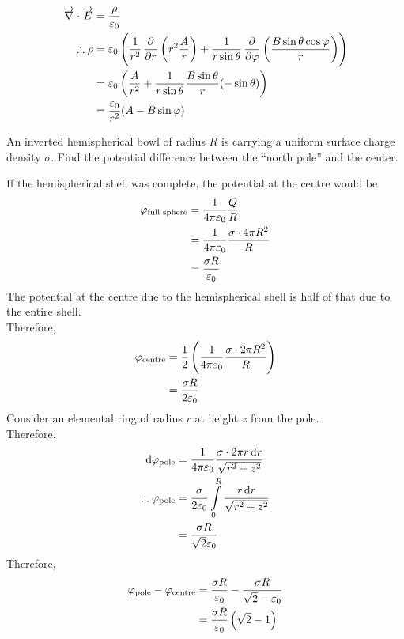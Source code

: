 \documentclass[fleqn, a4paper, 11pt, oneside]{amsart}
\theoremstyle{definition}
\theoremstyle{theorem}
\begin{document}
\begin{solution}
	\begin{align*}
		\overrightarrow{\nabla} \cdot \overrightarrow{E} &= \frac{\rho}{\varepsilon_0}\\
		\therefore \rho &= \varepsilon_0 \left( \frac{1}{r^2} \dpd{}{r} \left( r^2 \frac{A}{r} \right) + \frac{1}{r \sin \theta} \dpd{}{\varphi} \left( \frac{B \sin \theta \cos \varphi}{r} \right) \right)\\
		&= \varepsilon_0 \left( \frac{A}{r^2} + \frac{1}{r \sin \theta} \frac{B \sin \theta}{r} (-\sin \theta) \right)\\
		&= \frac{\varepsilon_0}{r^2} (A - B \sin \varphi)
	\end{align*}
\end{solution}

\begin{question}
	An inverted hemispherical bowl of radius $R$ is carrying a uniform surface charge density $\sigma$.
	Find the potential difference between the ``north pole'' and the center.
\end{question}

\begin{solution}
	If the hemispherical shell was complete, the potential at the centre would be
	\begin{align*}
		\varphi_{\textnormal{full sphere}} &= \frac{1}{4 \pi \varepsilon_0} \frac{Q}{R}\\
		&= \frac{1}{4 \pi \varepsilon_0} \frac{\sigma \cdot 4 \pi R^2}{R}\\
		&= \frac{\sigma R}{\varepsilon_0}
	\end{align*}
	The potential at the centre due to the hemispherical shell is half of that due to the entire shell.\\
	Therefore,
	\begin{align*}
		\varphi_{\textnormal{centre}} &= \frac{1}{2} \left( \frac{1}{4 \pi \varepsilon_0} \frac{\sigma \cdot 2 \pi R^2}{R} \right)\\
		&= \frac{\sigma R}{2 \varepsilon_0}
	\end{align*}
	Consider an elemental ring of radius $r$ at height $z$ from the pole.\\
	Therefore,
	\begin{align*}
		\dif \varphi_{\textnormal{pole}} &= \frac{1}{4 \pi \varepsilon_0} \frac{\sigma \cdot 2 \pi r \dif r}{\sqrt{r^2 + z^2}}\\
		\therefore \varphi_{\textnormal{pole}} &= \frac{\sigma}{2 \varepsilon_0} \int\limits_{0}^{R} \frac{r \dif r}{\sqrt{r^2 + z^2}}\\
		&= \frac{\sigma R}{\sqrt{2} \varepsilon_0}
	\end{align*}
	Therefore,
	\begin{align*}
		\varphi_{\textnormal{pole}} - \varphi_{\textnormal{centre}} &= \frac{\sigma R}{\varepsilon_0} - \frac{\sigma R}{\sqrt{2} - \varepsilon_0}\\
		&= \frac{\sigma R}{\varepsilon_0} \left( \sqrt{2} - 1 \right)
	\end{align*}
\end{solution}
\end{document}
